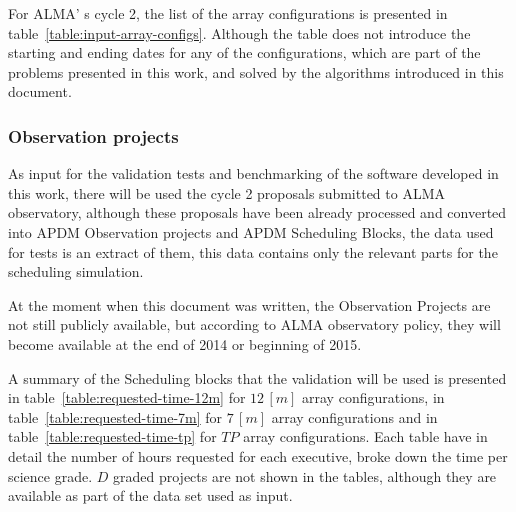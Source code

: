 For ALMA' s cycle 2, the list of the array configurations is presented in table~\ref{table:input-array-configs}. Although the table does not introduce the starting and ending dates for any of the configurations, which are part of the problems presented in this work, and solved by the algorithms introduced in this document.


\subsubsection{Observation projects}
As input for the validation tests and benchmarking of the software developed in this work, there will be used the cycle 2 proposals submitted to ALMA observatory, although these proposals have been already processed and converted into APDM Observation projects and APDM Scheduling Blocks, the data used for tests is an extract of them, this data contains only the relevant parts for the scheduling simulation.

At the moment when this document was written, the Observation Projects are not still publicly available, but according to ALMA observatory policy, they will become available at the end of 2014 or beginning of 2015. 

A summary of the Scheduling blocks that the validation will be used is presented in table~\ref{table:requested-time-12m} for $12\,[m]$ array configurations, in table~\ref{table:requested-time-7m} for $7\,[m]$ array configurations and in table~\ref{table:requested-time-tp} for $TP$  array configurations. Each table have in detail the number of hours requested for each executive, broke down the time per science grade. $D$ graded projects are not shown in the tables, although they are available as part of the data set used as input.

